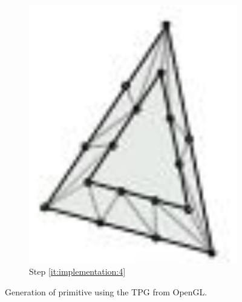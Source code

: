 \begin{figure}
\begin{subfigure}[b]{0.18\columnwidth}
		\includegraphics[width=\textwidth]{content/img/implementation/tessellation_4.png}
		\caption{Step \ref{it:implementation:4}}
		\label{fig:implementation:step:4}
	\end{subfigure}		
	\caption{Generation of primitive using the TPG from OpenGL.}
	\label{fig:implementation:step}
\end{figure}

